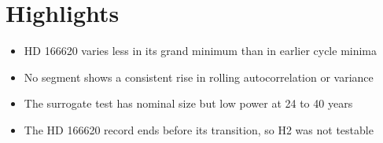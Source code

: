 \documentclass{article}
\begin{document}
\section*{Highlights}
\begin{itemize}
\item HD 166620 varies less in its grand minimum than in earlier cycle minima
\item No segment shows a consistent rise in rolling autocorrelation or variance
\item The surrogate test has nominal size but low power at 24 to 40 years
\item The HD 166620 record ends before its transition, so H2 was not testable
\end{itemize}
\end{document}
